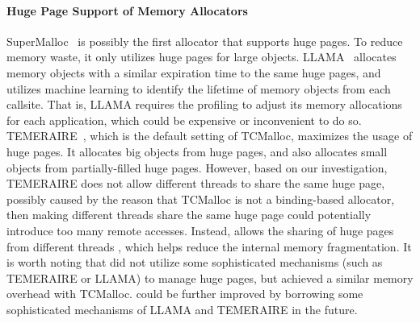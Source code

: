 \paragraph{Huge Page Support of Memory Allocators}
SuperMalloc~\cite{supermalloc} is possibly the first allocator that supports huge pages. To reduce memory waste, it only utilizes huge pages for large objects. LLAMA~\cite{LLAMA} allocates memory objects with a similar expiration time to the same huge pages, and utilizes machine learning to identify the lifetime of memory objects from each callsite. That is, LLAMA requires the profiling to adjust its memory allocations for each application, which could be expensive or inconvenient to do so. TEMERAIRE~\cite{TEMERAIRE}, which is the default setting of TCMalloc, maximizes the usage of huge pages. It allocates big objects from huge pages, and also allocates small objects from partially-filled huge pages. However, based on our investigation, TEMERAIRE does not allow different threads to share the same huge page, 
possibly caused by the reason that TCMalloc is not a binding-based allocator, then making different threads share the same huge page could potentially introduce too many remote accesses.  
Instead, \NM{} allows the sharing of huge pages from different threads 
, which helps reduce the internal memory fragmentation. It is worth noting that \NM{} did not utilize some sophisticated mechanisms (such as TEMERAIRE or LLAMA) to manage huge pages, but achieved a similar memory overhead with TCMalloc. 
\NM{} could be further improved by borrowing some sophisticated mechanisms of LLAMA and TEMERAIRE in the future. 



